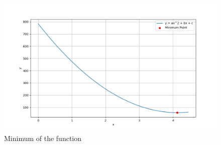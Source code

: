 \documentclass[journal]{IEEEtran}
\numberwithin{equation}{enumi}
\numberwithin{figure}{enumi}
\begin{document}
\begin{figure}[ht]
   \centering
   \includegraphics[width=1\columnwidth]{figs/fig.png}
   \caption{Minimum of the function}
\end{figure}
\end{document}
